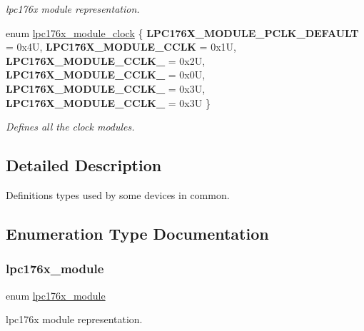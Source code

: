 \begin{DoxyCompactItemize}
\begin{DoxyCompactList}\small\item\em lpc176x module representation. \end{DoxyCompactList}\item 
enum \mbox{\hyperlink{common-types_8h_a85061df77e71b5b46c44251eebe4c5cf}{lpc176x\+\_\+module\+\_\+clock}} \{ \newline
{\bfseries L\+P\+C176\+X\+\_\+\+M\+O\+D\+U\+L\+E\+\_\+\+P\+C\+L\+K\+\_\+\+D\+E\+F\+A\+U\+LT} = 0x4U, 
{\bfseries L\+P\+C176\+X\+\_\+\+M\+O\+D\+U\+L\+E\+\_\+\+C\+C\+LK} = 0x1U, 
{\bfseries L\+P\+C176\+X\+\_\+\+M\+O\+D\+U\+L\+E\+\_\+\+C\+C\+L\+K\+\_} = 0x2U, 
{\bfseries L\+P\+C176\+X\+\_\+\+M\+O\+D\+U\+L\+E\+\_\+\+C\+C\+L\+K\+\_} = 0x0U, 
\newline
{\bfseries L\+P\+C176\+X\+\_\+\+M\+O\+D\+U\+L\+E\+\_\+\+C\+C\+L\+K\+\_} = 0x3U, 
{\bfseries L\+P\+C176\+X\+\_\+\+M\+O\+D\+U\+L\+E\+\_\+\+C\+C\+L\+K\+\_} = 0x3U
 \}
\begin{DoxyCompactList}\small\item\em Defines all the clock modules. \end{DoxyCompactList}\end{DoxyCompactItemize}


\subsection{Detailed Description}
Definitions types used by some devices in common. 



\subsection{Enumeration Type Documentation}
\mbox{\label{common-types_8h_a7183a9a227854e33c20d9153adf747cb}} 
\subsubsection{\texorpdfstring{lpc176x\_module}{lpc176x\_module}}
{\footnotesize\ttfamily enum \mbox{\hyperlink{common-types_8h_a7183a9a227854e33c20d9153adf747cb}{lpc176x\+\_\+module}}}



lpc176x module representation. 

